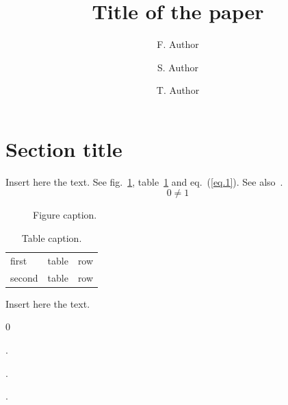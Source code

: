 \documentclass[doublecol]{epl2}
\title{Title of the paper}
\author{F. Author\inst{1,2} \and S. Author\inst{1} \and T. Author\inst{2}}
\institute{                    
  \inst{1} First Institute - Address\\
  \inst{2} Second Institute - Address
}
\begin{document}
\maketitle


\section{Section title}
Insert here the text.
See fig.~\ref{fig.1}, table~\ref{tab.1} and eq.~(\ref{eq.1}).
See also~\cite{b.a,b.b}.
\begin{equation}
\label{eq.1}
0\neq1
\end{equation}


\begin{figure}
\caption{Figure caption.}
\label{fig.1}
\end{figure}


\begin{table}
\caption{Table caption.}
\label{tab.1}
\begin{center}
\begin{tabular}{lcr}
first  & table & row\\
second & table & row
\end{tabular}
\end{center}
\end{table}



\acknowledgments
Insert here the text.

\begin{thebibliography}{0}

  .

  .

  .

\end{thebibliography}
\end{document}
